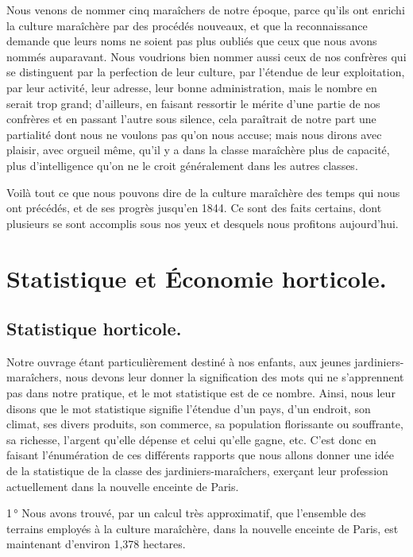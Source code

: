 \documentclass[10pt,a4paper]{book}
\begin{document}
Nous venons de nommer cinq maraîchers de notre époque, parce qu'ils ont enrichi la culture maraîchère par des procédés nouveaux, et que la reconnaissance demande que leurs noms ne soient pas plus oubliés que ceux que nous avons nommés auparavant. Nous voudrions bien nommer aussi ceux de nos confrères qui se distinguent par la perfection de leur culture, par l'étendue de leur exploitation, par leur activité, leur adresse, leur bonne administration, mais le nombre en serait trop grand; d'ailleurs, en faisant ressortir le mérite d'une partie de nos confrères et en passant l'autre sous silence, cela paraîtrait de notre part une partialité dont nous ne voulons pas qu'on nous accuse; mais nous dirons avec plaisir, avec orgueil même, qu'il y a dans la classe maraîchère plus de capacité, plus d'intelligence qu'on ne le croit généralement dans les autres classes.

Voilà tout ce que nous pouvons dire de la culture maraîchère des temps qui nous ont précédés, et de ses progrès jusqu'en 1844. Ce sont des faits certains, dont plusieurs se sont accomplis sous nos yeux et desquels nous profitons aujourd'hui.

\chapter{Statistique et Économie horticole.}

\section{Statistique horticole.}

Notre ouvrage étant particulièrement destiné à nos enfants, aux jeunes jardiniers-maraîchers, nous devons leur donner la signification des mots qui ne s'apprennent pas dans notre pratique, et le mot statistique est de ce nombre. Ainsi, nous leur disons que le mot statistique signifie l'étendue d'un pays, d'un endroit, son climat, ses divers produits, son commerce, sa population florissante ou souffrante, sa richesse, l'argent qu'elle dépense et celui qu'elle gagne, etc. C'est donc en faisant l'énumération de ces différents rapports que nous allons donner une idée de la statistique de la classe des jardiniers-maraîchers, exerçant leur profession actuellement dans la nouvelle enceinte de Paris.

1\,° Nous avons trouvé, par un calcul très approximatif, que l'ensemble des terrains employés à la culture maraîchère, dans la nouvelle enceinte de Paris, est maintenant d'environ 1,378 hectares.
\end{document}
